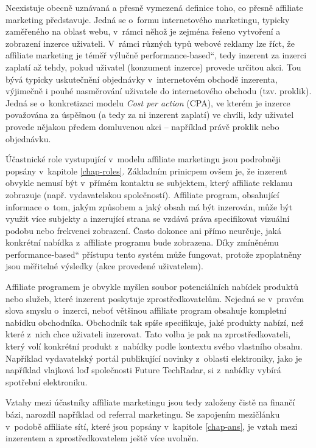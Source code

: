 \documentclass[12pt,twoside,openany]{fithesis}
\begin{document}
Neexistuje obecně uznávaná a přesně vymezená definice toho, co přesně 
affiliate marketing představuje. Jedná se o~formu internetového marketingu, 
typicky zaměřeného na oblast webu, v~rámci něhož je zejména řešeno 
vytvoření a zobrazení inzerce uživateli. V~rámci různých typů webové 
reklamy lze říct, že affiliate marketing je téměř výlučně \glqq 
performance-based\textquotedblleft{}, tedy 
inzerent za inzerci zaplatí až tehdy, pokud uživatel (konzument inzerce) 
provede určitou akci. \cite{performance-based-advertising}{} Tou bývá 
typicky uskutečnění objednávky v~internetovém obchodě inzerenta, 
výjimečně i pouhé nasměrování uživatele do internetového obchodu (tzv. 
proklik). \cite{copmlete-guide-to-am}{} Jedná se o~konkretizaci modelu 
{\em{Cost per action}} (CPA), ve kterém je inzerce 
považována za úspěšnou (a tedy za ni inzerent zaplatí) ve chvíli, kdy 
uživatel provede nějakou předem domluvenou akci -- například právě 
proklik nebo objednávku.

Účastnické role vystupující v~modelu affiliate marketingu jsou podrobněji 
popsány v~kapitole \hyperlink{chap-roles}{{\ref{chap-roles}}}. Základním 
prinicpem ovšem je, že inzerent obvykle nemusí být v~přímém kontaktu se 
subjektem, který affiliate reklamu zobrazuje (např. vydavatelskou 
společností). Affiliate program, obsahující informace o~tom, jakým 
způsobem a jaký obsah má být inzerován, může být využit více subjekty 
a inzerující strana se vzdává práva specifikovat vizuální podobu nebo 
frekvenci zobrazení. Často dokonce ani přímo neurčuje, jaká konkrétní 
nabídka z~affiliate programu bude zobrazena. Díky zmíněnému \glqq 
performance-based\textquotedblleft{} přístupu tento systém může fungovat, 
protože zpoplatněny jsou měřitelné výsledky (akce provedené uživatelem).

Affiliate programem je obvykle myšlen soubor potenciálních nabídek 
produktů nebo služeb, které inzerent poskytuje zprostředkovatelům. 
Nejedná se v~pravém slova smyslu o~inzerci, neboť většinou affiliate 
program obsahuje kompletní nabídku obchodníka. Obchodník tak spíše 
specifikuje, jaké produkty nabízí, než které z~nich chce uživateli 
inzerovat. Tato volba je pak na zprostředkovateli, který volí konkrétní 
produkt z~nabídky podle kontextu svého vlastního obsahu. Například 
vydavatelský portál publikující novinky z~oblasti elektroniky, jako je 
například vlajková loď společnosti Future TechRadar, si z~nabídky 
vybírá spotřební elektroniku.

Vztahy mezi účastníky affiliate marketingu jsou tedy založeny čistě na 
finančí bázi, narozdíl například od referral marketingu. \cite{referral-marketing}{} Se zapojením mezičlánku v~podobě 
affiliate sítí, které jsou popsány v~kapitole 
\hyperlink{chap-ans}{{\ref{chap-ans}}}, je vztah mezi inzerentem a 
zprostředkovatelem ještě více uvolněn.
\end{document}
